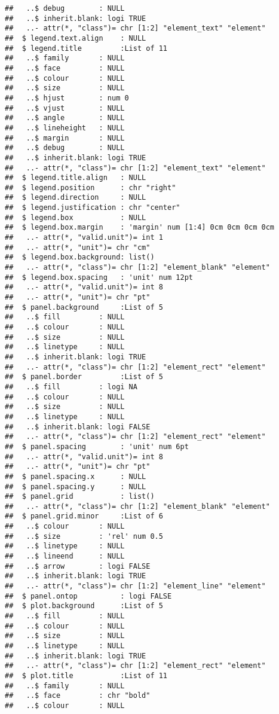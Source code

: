 \documentclass[]{article}
\begin{document}
\begin{verbatim}
##   ..$ debug        : NULL
##   ..$ inherit.blank: logi TRUE
##   ..- attr(*, "class")= chr [1:2] "element_text" "element"
##  $ legend.text.align    : NULL
##  $ legend.title         :List of 11
##   ..$ family       : NULL
##   ..$ face         : NULL
##   ..$ colour       : NULL
##   ..$ size         : NULL
##   ..$ hjust        : num 0
##   ..$ vjust        : NULL
##   ..$ angle        : NULL
##   ..$ lineheight   : NULL
##   ..$ margin       : NULL
##   ..$ debug        : NULL
##   ..$ inherit.blank: logi TRUE
##   ..- attr(*, "class")= chr [1:2] "element_text" "element"
##  $ legend.title.align   : NULL
##  $ legend.position      : chr "right"
##  $ legend.direction     : NULL
##  $ legend.justification : chr "center"
##  $ legend.box           : NULL
##  $ legend.box.margin    : 'margin' num [1:4] 0cm 0cm 0cm 0cm
##   ..- attr(*, "valid.unit")= int 1
##   ..- attr(*, "unit")= chr "cm"
##  $ legend.box.background: list()
##   ..- attr(*, "class")= chr [1:2] "element_blank" "element"
##  $ legend.box.spacing   : 'unit' num 12pt
##   ..- attr(*, "valid.unit")= int 8
##   ..- attr(*, "unit")= chr "pt"
##  $ panel.background     :List of 5
##   ..$ fill         : NULL
##   ..$ colour       : NULL
##   ..$ size         : NULL
##   ..$ linetype     : NULL
##   ..$ inherit.blank: logi TRUE
##   ..- attr(*, "class")= chr [1:2] "element_rect" "element"
##  $ panel.border         :List of 5
##   ..$ fill         : logi NA
##   ..$ colour       : NULL
##   ..$ size         : NULL
##   ..$ linetype     : NULL
##   ..$ inherit.blank: logi FALSE
##   ..- attr(*, "class")= chr [1:2] "element_rect" "element"
##  $ panel.spacing        : 'unit' num 6pt
##   ..- attr(*, "valid.unit")= int 8
##   ..- attr(*, "unit")= chr "pt"
##  $ panel.spacing.x      : NULL
##  $ panel.spacing.y      : NULL
##  $ panel.grid           : list()
##   ..- attr(*, "class")= chr [1:2] "element_blank" "element"
##  $ panel.grid.minor     :List of 6
##   ..$ colour       : NULL
##   ..$ size         : 'rel' num 0.5
##   ..$ linetype     : NULL
##   ..$ lineend      : NULL
##   ..$ arrow        : logi FALSE
##   ..$ inherit.blank: logi TRUE
##   ..- attr(*, "class")= chr [1:2] "element_line" "element"
##  $ panel.ontop          : logi FALSE
##  $ plot.background      :List of 5
##   ..$ fill         : NULL
##   ..$ colour       : NULL
##   ..$ size         : NULL
##   ..$ linetype     : NULL
##   ..$ inherit.blank: logi TRUE
##   ..- attr(*, "class")= chr [1:2] "element_rect" "element"
##  $ plot.title           :List of 11
##   ..$ family       : NULL
##   ..$ face         : chr "bold"
##   ..$ colour       : NULL

\end{verbatim}
\end{document}

